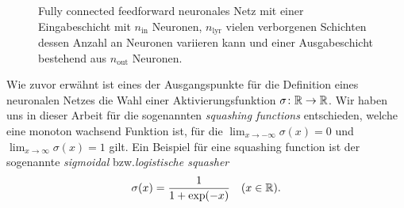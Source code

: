 \begin{center}
\begin{figure}
        \caption{Fully connected feedforward neuronales Netz mit einer Eingabeschicht mit $n_{\mathrm{in}}$ Neuronen, $n_{\mathrm{lyr}}$ vielen verborgenen Schichten dessen Anzahl an Neuronen variieren kann und einer Ausgabeschicht bestehend aus $n_{\mathrm{out}}$ Neuronen.}
        \label{fig:DNN}
    \end{figure}
\end{center}
Wie zuvor erwähnt ist eines der Ausgangspunkte für die Definition eines neuronalen Netzes die Wahl einer Aktivierungsfunktion $\sigma\colon \mathbb{R} \to \mathbb{R}$. Wir haben uns in dieser Arbeit für die sogenannten \textit{squashing functions} entschieden, welche eine monoton wachsend Funktion ist, für die $\lim_{x \to -\infty}\sigma(x) = 0$ und $\lim_{x \to \infty}\sigma(x) = 1$ gilt. Ein Beispiel für eine squashing function ist der sogenannte \emph{sigmoidal} bzw.\@ \emph{logistische squasher}
\begin{align}
\label{logsquasher}
\sigma(x) = \frac{1}{1 + \exp(-x)} \quad (x \in \mathbb{R}).
\end{align}

